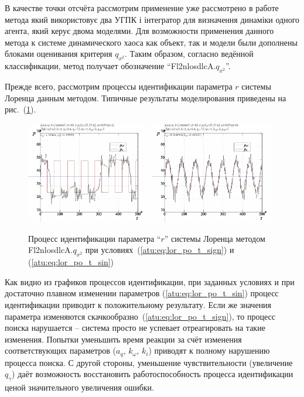 В качестве точки отсчёта рассмотрим применение уже рассмотрено в работе~\cite{atu_phd_thesis}
%
метода який використовує два УГПК і інтегратор для визначення динаміки одного агента,
який керує двома моделями.
%
Для возможности применения данного метода к системе динамического хаоса
как объект, так и модели были дополнены блоками оценивания критерия $q_{x^2}$.
Таким образом, согласно ведённой классификации,
метод получает обозначение
``Fl2nlosdlcA.$q_{x^2}$''.

Прежде всего, рассмотрим процессы идентификации параметра $r$
системы Лоренца данным методом. Типичные результаты моделирования
приведены на рис.~(\ref{atu:f:lor_id_Fl2nlosdlcA_wp009}).

\begin{figure}[ht!]
  \centerline{
    \includegraphics[width=0.49\textwidth]{p/cha/lor/Fl2nlosdlcA/Fl2nlosdlcA-p_xz_1_wp009.png}
    \hfill
    \includegraphics[width=0.49\textwidth]{p/cha/lor/Fl2nlosdlcA/Fl2nlosdlcA-p_xz_0_wp009.png}
  }
  \caption{Процесс идентификации параметра ``$r$'' системы Лоренца методом Fl2nlosdlcA.$q_{x^2}$ при условиях~(\ref{atu:eq:lor_po_t_sign}) и (\ref{atu:eq:lor_po_t_sin})}
  \label{atu:f:lor_id_Fl2nlosdlcA_wp009}
\end{figure}

Как видно из графиков процессов идентификации,
при заданных условиях и
при достаточно плавном изменении параметров
(\ref{atu:eq:lor_po_t_sin}) процесс идентификации приводит
к положительному результату. Если же значения параметра изменяются
скачкообразно~(\ref{atu:eq:lor_po_t_sign}),
то процесс поиска нарушается -- система просто не успевает
отреагировать на такие изменения. Попытки уменьшить
время реакции за счёт изменения соответствующих
параметров ($a_q$, $k_\omega$, $k_i$) приводят к полному нарушению
процесса поиска. С другой стороны, уменьшение чувствительности
(увеличение $q_\gamma$) даёт возможность восстановить
работоспособность процесса идентификации ценой
значительного увеличения ошибки.

